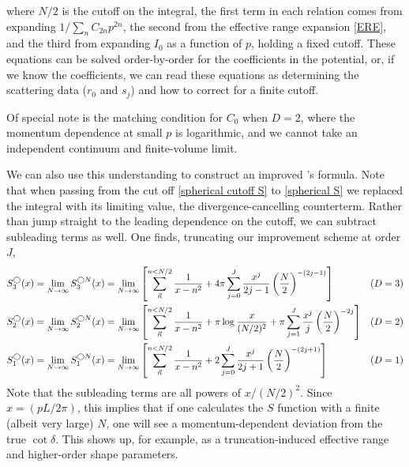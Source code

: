 where $N/2$ is the cutoff on the integral, the first term in each relation comes from expanding $1/\sum_n C_{2n} p^{2n}$, the second from the effective range expansion \eqref{ERE}, and the third from expanding $I_0$ as a function of $p$, holding a fixed cutoff.  These equations can be solved order-by-order for the coefficients in the potential, or, if we know the coefficients, we can read these equations as determining the scattering data ($r_0$ and $s_j$) and how to correct for a finite cutoff.

Of special note is the matching condition for $C_0$ when $D=2$, where the momentum dependence at small $p$ is logarithmic, and we cannot take an independent continuum and finite-volume limit.

We can also use this understanding to construct an improved \Luscher's formula.
Note that when passing from the cut off \eqref{spherical cutoff S} to \eqref{spherical S} we replaced the integral with its limiting value, the divergence-cancelling counterterm.
Rather than jump straight to the leading dependence on the cutoff, we can subtract subleading terms as well.
One finds, truncating our improvement scheme at order $J$,
\begin{align}
    S_3^\bigcirc(x)  = \lim_{N\rightarrow\infty} S^{\bigcirc N}_3(x)
    &=
    \lim_{N\rightarrow\infty}\left[\sum_{\vec{n}}^{n<N/2} \frac{1}{x-n^2}
        + 4\pi \sum_{j=0}^{J} \frac{x^j}{2j-1} \left(\frac{N}{2}\right)^{-(2j-1)}
    \right]
    &
    (D&=3)
    \nonumber\\
    S_2^\bigcirc(x)  = \lim_{N\rightarrow\infty} S^{\bigcirc N}_2(x)
    &=
    \lim_{N\rightarrow\infty}\left[\sum_{\vec{n}}^{n<N/2} \frac{1}{x-n^2}
        + \pi \log \frac{x}{(N/2)^2}
        + \pi \sum_{j=1}^{J} \frac{x^j}{j} \left(\frac{N}{2}\right)^{-2j}
    \right]
    &
    (D&=2)
    \label{eq:improved spherical S}\\\nonumber
    S_1^\bigcirc(x)  = \lim_{N\rightarrow\infty} S^{\bigcirc N}_1(x)
    &=
    \lim_{N\rightarrow\infty}\left[\sum_{\vec{n}}^{n<N/2} \frac{1}{x-n^2}
        + 2 \sum_{j=0}^{J} \frac{x^j}{2j+1}\left(\frac{N}{2}\right)^{-(2j+1)}
        \right]
    &
    (D&=1)
\end{align}
Note that the subleading terms are all powers of $x/(N/2)^2$.
Since $x=(pL/2\pi)$, this implies that if one calculates the $S$ function with a finite (albeit very large) $N$, one will see a momentum-dependent deviation from the true $\cot\delta$.
This shows up, for example, as a truncation-induced effective range and higher-order shape parameters.

\begin{center}
\end{center}

